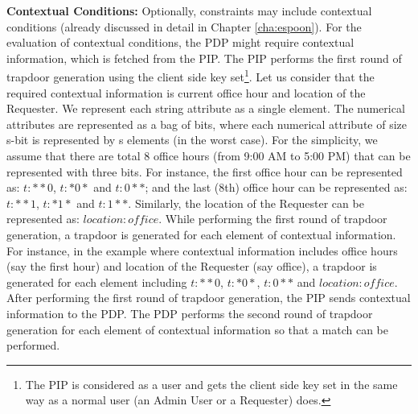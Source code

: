 \documentclass[epsfig,a4paper,11pt,titlepage]{book}
\numberwithin{algorithm}{chapter}
\begin{document}
\noindent \textbf{Contextual Conditions:} Optionally, constraints may include contextual conditions (already discussed in detail in Chapter \ref{cha:espoon}). For the evaluation of contextual conditions, the \gls{PDP} might require contextual information, which is fetched from the \gls{PIP}. The \gls{PIP} performs the first round of trapdoor generation using the client side key set\footnote{The \gls{PIP} is considered as a user and gets the client side key set in the same way as a normal user (an Admin User or a Requester) does.}. Let us consider that the required contextual information is current office hour and location of the Requester. We represent each string attribute as a single element. The numerical attributes are represented as a bag of bits, where each numerical attribute of size s-bit is represented by s elements (in the worst case). For the simplicity, we assume that there are total 8 office hours (from 9:00 AM to 5:00 PM) that can be represented with three bits. For instance, the first office hour can be represented as: $\mathit{t:**0}$, $\mathit{t:*0*}$ and $\mathit{t:0**}$; and the last (8th) office hour can be represented as: $\mathit{t:**1}$, $\mathit{t:*1*}$ and $\mathit{t:1**}$. Similarly, the location of the Requester can be represented as: $\mathit{location:office}$. While performing the first round of trapdoor generation, a trapdoor is generated for each element of contextual information. For instance, in the example where contextual information includes office hours (say the first hour) and location of the Requester (say office), a trapdoor is generated for each element including $\mathit{t:**0}$, $\mathit{t:*0*}$, $\mathit{t:0**}$ and $\mathit{location:office}$. After performing the first round of trapdoor generation, the \gls{PIP} sends contextual information to the \gls{PDP}. The \gls{PDP} performs the second round of trapdoor generation for each element of contextual information so that a match can be performed.
\end{document}
